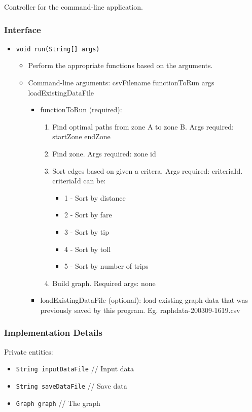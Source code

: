\documentclass[12pt]{article}
\newcommand{\bi}{\begin{itemize}}
\newcommand{\ei}{\end{itemize}}
\newcommand{\be}{\begin{enumerate}}
\newcommand{\ee}{\end{enumerate}}
\newcommand{\code}[1]{\texttt{#1}}
\begin{document}
Controller for the command-line application. 

\subsubsection{Interface}
\label{sec:cmdlineinterface}

\bi
   	\item \code{void run(String[] args)}
	\bi
		\item Perform the appropriate functions based on the arguments.
		\item Command-line arguments: csvFilename functionToRun args loadExistingDataFile
	  	\bi
	  		\item functionToRun (required):
	  		\be
	  			\item Find optimal paths from zone A to zone B. Args required: startZone endZone
	  			\item Find zone. Args required: zone id
	  			\item Sort edges based on given a critera. Args required: criteriaId. criteriaId can be:
		  			\bi
		  				\item 1 - Sort by distance
		  				\item 2 - Sort by fare
		  				\item 3 - Sort by tip
		  				\item 4 - Sort by toll
		  				\item 5 - Sort by number of trips
		  			\ei
		  		\item Build graph. Required args: none
	  		\ee
	  		\item loadExistingDataFile (optional): load existing graph data that was previously saved by this program. Eg. raphdata-200309-1619.csv 
	  	\ei
	\ei
\ei

\subsubsection{Implementation Details}

Private entities:
\bi
    \item \code{String inputDataFile} // Input data
    \item \code{String saveDataFile} // Save data
	\item \code{Graph graph} // The graph
\ei
\end{document}

